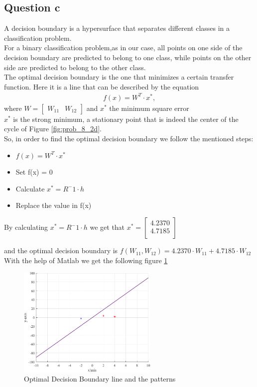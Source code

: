 \subsection{Question c}
A decision boundary is a hypersurface that separates different classes in a classification problem.\\
For a binary classification problem,as in our case, all points on one side of the decision boundary are predicted to belong to one class, while points on the other side are predicted to belong to the other class.\\
The optimal decision boundary is the one that minimizes a certain transfer function. Here it is a line that can be described by the equation 
\[
\begin{gathered}
	f(x) = W^T \cdot x^*, 
\end{gathered}
\]
where $
W=\left[\begin{array}{cc}
	W_{11} & W_{12}
\end{array}
\right]
$ and $x^*$ the minimum square error \\
$x^*$ is the strong minimum, a stationary point that is indeed the center of the cycle of Figure \ref{fig:prob_8_2d}.\\

So, in order to find the optimal decision boundary we follow the mentioned steps:
\begin{itemize}
	\item $f(x) = W^T \cdot x^*$
	\item Set f(x) = 0
	\item Calculate $x^* = R^-1 \cdot h$
	\item Replace the value in f(x)
\end{itemize}

By calculating $x^* = R^-1 \cdot h$ we get that $x^* = \left[\begin{array}{c}
															4.2370 \\
															4.7185 \\
														\end{array}
														\right] $

\vspace{5mm}
and the optimal decision boundary is $f(W_{11},W_{12}) = 4.2370 \cdot W_{11} + 4.7185 \cdot W_{12} $ \\

With the help of Matlab we get the following figure \ref{fig:patterns}

\begin{figure}[H]
	\centering
	\includegraphics[width = 0.6\textwidth]{../Problem 8/patterns.pdf}
	\caption{Optimal Decision Boundary line and the patterns}
	\label{fig:patterns}
\end{figure}





	

